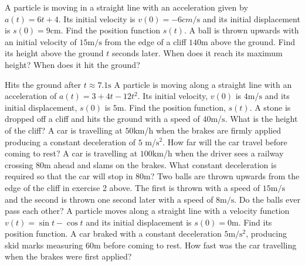 \begin{Exercise}[title={Applications},label=exApp]
\Question A particle is moving in a straight line with an acceleration given by $a (t) =6 t +4.$ Its initial velocity is $v (0) = -6 cm/\mbox{s}$ and its initial displacement is $s (0) =9 \mbox{cm}$. Find the position function $s (t)\text{.}$ 
\Question A ball is thrown upwards with an initial velocity of $15 \mathrm{m}/\mbox{s}$ from the edge of a cliff $140 \mbox{m}$ above the ground. Find its
height above the ground $t$ seconds later. When does it reach its maximum height? When
does it hit the ground? 

Hits the ground after $t \approx 7.1 \mbox{s}$
\Question A particle is moving along a straight line with an acceleration of $a (t) =3 +4 t -12 t^{2}$. Its initial velocity, $v (0)$ is $4 \mbox{m}$/$\mbox{s}$ and its initial displacement, $s (0)$ is $5 \mbox{m}$. Find the position function,
$s (t)$. 
\Question A stone is dropped off a cliff and hits the ground with a speed of $40 \mbox{m}$/$\mbox{s}$. What is the height of the cliff? 
\Question A car is travelling at $50 \mbox{km}$/$\mbox{h}$ when the brakes are firmly applied producing a constant deceleration of $5$ $\mbox{m}$/$\mathrm{s}^{2}$. How far will the car travel before coming to rest? 
\Question A car is travelling at $100 \mbox{km}$/$\mbox{h}$ when the driver sees a railway crossing $80 \mbox{m}$ ahead and slams on the brakes. What constant deceleration is required so that the car will stop in $80 \mbox{m}$? 
\Question Two balls are thrown upwards from the edge of the cliff in exercise 2 above. The first is thrown with a speed of $15 \mathrm{m}/\mbox{s}$ and the second is thrown one second later with a speed of $8 \mathrm{m}/\mbox{s}$. Do the balls ever pass each other? 
\Question A particle moves along a straight line with a velocity function $v (t) =\sin  t -\cos  t$ and its initial displacement is $s (0) =0 \mbox{m}$. Find its position function. 
\Question A car braked with a constant deceleration $5 \mathrm{m}/\mathrm{s}^{2}$, producing skid marks measuring $60 \mbox{m}$ before coming to rest. How
fast was the car travelling when the brakes were first applied? 


\end{Exercise}
